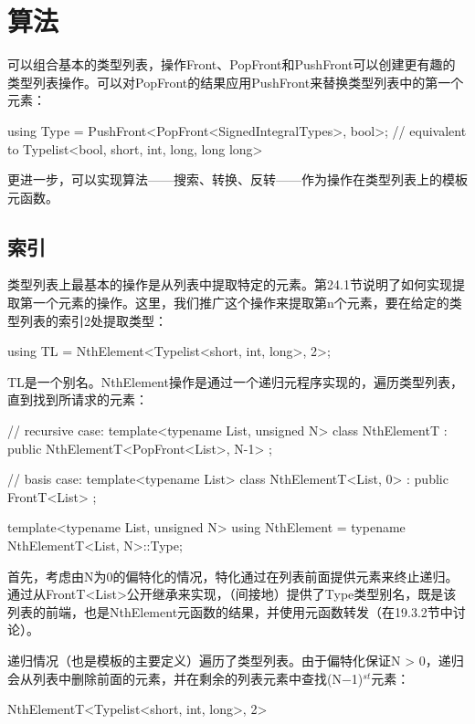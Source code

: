 \section{算法}

可以组合基本的类型列表，操作Front、PopFront和PushFront可以创建更有趣的类型列表操作。可以对PopFront的结果应用PushFront来替换类型列表中的第一个元素：

\begin{cpp}
using Type = PushFront<PopFront<SignedIntegralTypes>, bool>;
			// equivalent to Typelist<bool, short, int, long, long long>
\end{cpp}

更进一步，可以实现算法——搜索、转换、反转——作为操作在类型列表上的模板元函数。

\subsection{索引}

类型列表上最基本的操作是从列表中提取特定的元素。第24.1节说明了如何实现提取第一个元素的操作。这里，我们推广这个操作来提取第n个元素，要在给定的类型列表的索引2处提取类型：

\begin{cpp}
using TL = NthElement<Typelist<short, int, long>, 2>;
\end{cpp}

TL是一个别名。NthElement操作是通过一个递归元程序实现的，遍历类型列表，直到找到所请求的元素：

\begin{cpp}
// recursive case:
template<typename List, unsigned N>
class NthElementT : public NthElementT<PopFront<List>, N-1>
{
};

// basis case:
template<typename List>
class NthElementT<List, 0> : public FrontT<List>
{
};

template<typename List, unsigned N>
using NthElement = typename NthElementT<List, N>::Type;
\end{cpp}

首先，考虑由N为0的偏特化的情况，特化通过在列表前面提供元素来终止递归。通过从FrontT<List>公开继承来实现，（间接地）提供了Type类型别名，既是该列表的前端，也是NthElement元函数的结果，并使用元函数转发（在19.3.2节中讨论）。

递归情况（也是模板的主要定义）遍历了类型列表。由于偏特化保证N > 0，递归会从列表中删除前面的元素，并在剩余的列表元素中查找(N−1)$ ^{st} $元素：

\begin{cpp}
NthElementT<Typelist<short, int, long>, 2>
\end{cpp}

